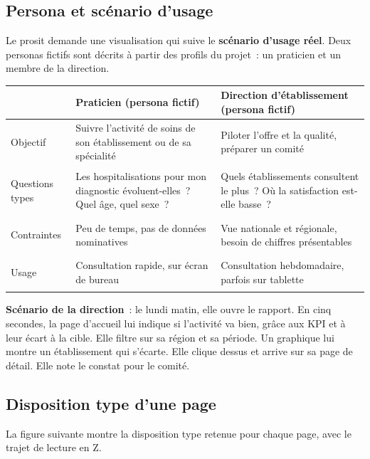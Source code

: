\subsection{Persona et scénario d'usage}

\noindent Le prosit demande une visualisation qui suive le \textbf{scénario d'usage réel}. Deux personas fictifs sont décrits à partir des profils du projet~: un praticien et un membre de la direction.

\begin{center}
\small
\begin{tabularx}{\textwidth}{>{\bfseries\raggedright\arraybackslash}p{2.6cm} >{\raggedright\arraybackslash}X >{\raggedright\arraybackslash}X}
\toprule
 & Praticien (persona fictif) & Direction d'établissement (persona fictif) \\
\midrule
Objectif & Suivre l'activité de soins de son établissement ou de sa spécialité & Piloter l'offre et la qualité, préparer un comité \\
Questions types & Les hospitalisations pour mon diagnostic évoluent-elles~? Quel âge, quel sexe~? & Quels établissements consultent le plus~? Où la satisfaction est-elle basse~? \\
Contraintes & Peu de temps, pas de données nominatives & Vue nationale et régionale, besoin de chiffres présentables \\
Usage & Consultation rapide, sur écran de bureau & Consultation hebdomadaire, parfois sur tablette \\
\bottomrule
\end{tabularx}
\end{center}

\noindent \textbf{Scénario de la direction}~: le lundi matin, elle ouvre le rapport. En cinq secondes, la page d'accueil lui indique si l'activité va bien, grâce aux KPI et à leur écart à la cible. Elle filtre sur sa région et sa période. Un graphique lui montre un établissement qui s'écarte. Elle clique dessus et arrive sur sa page de détail. Elle note le constat pour le comité.

\subsection{Disposition type d'une page}

\noindent La figure suivante montre la disposition type retenue pour chaque page, avec le trajet de lecture en Z.

